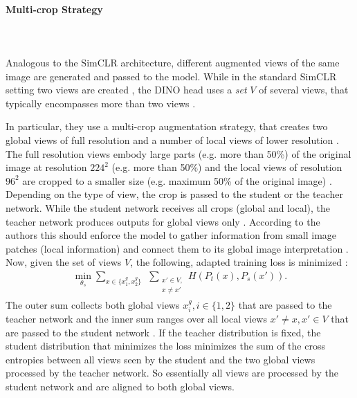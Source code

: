 \paragraph{Multi-crop Strategy} \mbox{} \\
\\
Analogous to the SimCLR architecture, different augmented views of the same image are generated and passed to the model.
While in the standard SimCLR setting two views are created \citep{Chen2020}, the DINO head uses a \textit{set} $V$ of several views, that typically encompasses more than two views \citep{Caron2021}.
\par
In particular, they use a multi-crop augmentation strategy, that creates two global views of full resolution and a number of local views of lower resolution \citep{Caron2020, Caron2021}. 
The full resolution views embody large parts (e.g. more than 50\%) of the original image at resolution $224^2$ (e.g. more than 50\%) and the local views of resolution $96^2$ are cropped to a smaller size (e.g. maximum 50\% of the original image) \citep{Caron2021}.
Depending on the type of view, the crop is passed to the student or the teacher network.
While the student network receives all crops (global and local), the teacher network produces outputs for global views only \citep{Caron2021}.
According to the authors this should enforce the model to gather information from small image patches (local information) and connect them to its global image interpretation \citep{Caron2021}.
Now, given the set of views $V$, the following, adapted training loss is minimized \citep{Caron2021}:
\begin{align}
	\min_{\theta_s}\sum_{x \in \{x_1^g, x_2^g\}} \hspace{5pt} \sum_{\substack{ x\prime \in V, \\ x\neq x\prime}} H(P_t(x),P_s(x\prime)).
	\label{equation:dino-training-objective}
\end{align}
The outer sum collects both global views $x_i^g, i\in\{1,2\}$ that are passed to the teacher network and the inner sum ranges over all local views $x\prime \neq x, x \prime \in V $ that are passed to the student network \citep{Caron2021}.
If the teacher distribution is fixed, the student distribution that minimizes the loss minimizes the sum of the cross entropies between all views seen by the student and the two global views processed by the teacher network.
So essentially all views are processed by the student network and are aligned to both global views.
